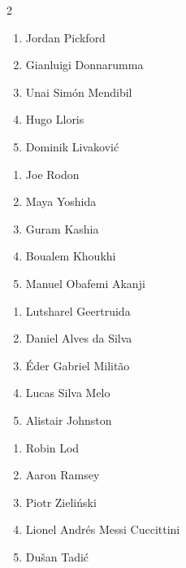\documentclass[11pt]{article}
\begin{document}
\begin{multicols}{2}

\begin{samepage}
\begin{tcolorbox}[evalbox,title=\textbf{Manuel Neuer (Goalkeeper)} \hfill Score:\ \rule{1cm}{0.4pt}]
\begin{enumerate}
\item Jordan Pickford
\item Gianluigi Donnarumma
\item Unai Simón Mendibil
\item Hugo Lloris
\item Dominik Livaković
\end{enumerate}
\end{tcolorbox}
\end{samepage}

\begin{samepage}
\begin{tcolorbox}[evalbox,title=\textbf{Virgil van Dijk (Left Center Back)} \hfill Score:\ \rule{1cm}{0.4pt}]
\begin{enumerate}
\item Joe Rodon
\item Maya Yoshida
\item Guram Kashia
\item Boualem Khoukhi
\item Manuel Obafemi Akanji
\end{enumerate}
\end{tcolorbox}
\end{samepage}

\begin{samepage}
\begin{tcolorbox}[evalbox,title=\textbf{Trent Alexander-Arnold (Right Defensive Midfield)} \hfill Score:\ \rule{1cm}{0.4pt}]
\begin{enumerate}
\item Lutsharel Geertruida
\item Daniel Alves da Silva
\item Éder Gabriel Militão
\item Lucas Silva Melo
\item Alistair Johnston
\end{enumerate}
\end{tcolorbox}
\end{samepage}

\begin{samepage}
\begin{tcolorbox}[evalbox,title=\textbf{Kevin De Bruyne (Center Attacking Midfield)} \hfill Score:\ \rule{1cm}{0.4pt}]
\begin{enumerate}
\item Robin Lod
\item Aaron Ramsey
\item Piotr Zieliński
\item Lionel Andrés Messi Cuccittini
\item Dušan Tadić
\end{enumerate}
\end{tcolorbox}
\end{samepage}


\end{multicols}
\end{document}
